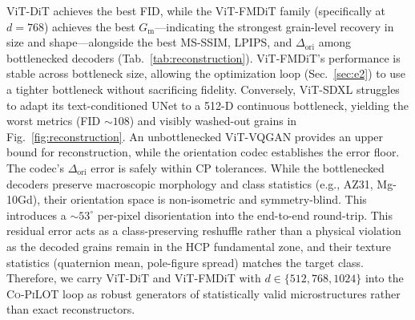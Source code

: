 \documentclass{article}
\newcommand{\Co}{\textsc{Co-PiLOT}}
\begin{document}
ViT-DiT achieves the best FID, while the ViT-FMDiT family (specifically at $d{=}768$) achieves the best $G_{\mathrm{m}}$—indicating the strongest grain-level recovery in size and shape—alongside the best MS-SSIM, LPIPS, and $\Delta_{\mathrm{ori}}$ among bottlenecked decoders (Tab.~\ref{tab:reconstruction}). ViT-FMDiT's performance is stable across bottleneck size, allowing the optimization loop (Sec.~\ref{sec:e2}) to use a tighter bottleneck without sacrificing fidelity. Conversely, ViT-SDXL struggles to adapt its text-conditioned UNet to a 512-D continuous bottleneck, yielding the worst metrics (FID $\sim\!108$) and visibly washed-out grains in Fig.~\ref{fig:reconstruction}. An unbottlenecked ViT-VQGAN provides an upper bound for reconstruction, while the orientation codec establishes the error floor. The codec's $\Delta_{\mathrm{ori}}$ error is safely within CP tolerances. While the bottlenecked decoders preserve macroscopic morphology and class statistics (e.g., AZ31, Mg-10Gd), their orientation space is non-isometric and symmetry-blind. This introduces a ${\sim}53^\circ$ per-pixel disorientation into the end-to-end round-trip. This residual error acts as a class-preserving reshuffle rather than a physical violation as the decoded grains remain in the HCP fundamental zone, and their texture statistics (quaternion mean, pole-figure spread) matches the target class. Therefore, we carry ViT{-}DiT and ViT{-}FMDiT with $d\in\{512,768,1024\}$ into the \Co{} loop as robust generators of statistically valid microstructures rather than exact reconstructors.
\end{document}
